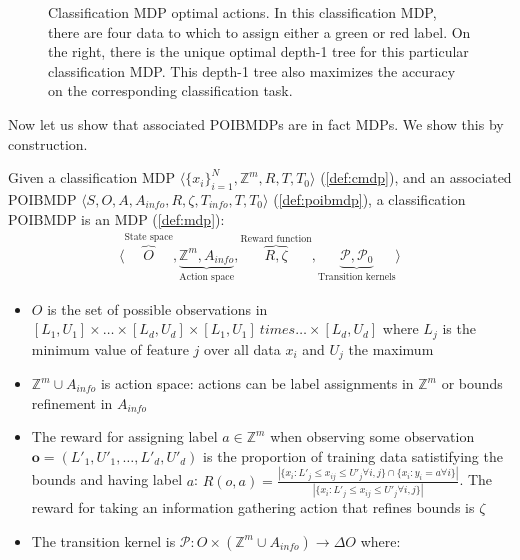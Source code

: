 \begin{figure}[h]
    \caption{Classification MDP optimal actions. In this classification MDP, there are four data to which to assign either a green or red label.
    On the right, there is the unique optimal depth-1 tree for this particular classification MDP. This depth-1 tree also maximizes the accuracy on the corresponding classification task.}\label{example:cmdp}
    \end{figure}

Now let us show that associated POIBMDPs are in fact MDPs. We show this by construction.

\begin{definition}\label{def:cpoibmdp}
    Given a classification MDP $\langle {\{x_i\}}_{i=1}^N, \mathbb{Z}^m, R, T, T_0 \rangle$ (\ref{def:cmdp}), and an associated POIBMDP $\langle S, O, A, A_{info}, R, \zeta, T_{info}, T, T_0\rangle$ (\ref{def:poibmdp}), a classification POIBMDP is an MDP (\ref{def:mdp}):
    \begin{align*}
        \langle \overbrace{O}^{\text{State space}}, \underbrace{\mathbb{Z}^m, A_{info}}_{\text{Action space}}, \overbrace{R, \zeta}^{\text{Reward function}}, \underbrace{\mathcal{P}, \mathcal{P}_0}_{\text{Transition kernels}} \rangle
    \end{align*}
    \begin{itemize}
        \item $O$ is the set of possible observations in $[L_1, U_1] \times \dots \times [L_d, U_d] \times [L_1, U_1] \ times \dots \times [L_d, U_d] $ where $L_j$ is the minimum value of feature $j$ over all data $x_i$ and $U_j$ the maximum
        \item $\mathbb{Z}^m \cup A_{info}$ is action space: actions can be label assignments in $\mathbb{Z}^m$ or bounds refinement in $A_{info}$
        \item The reward for assigning label $a\in \mathbb{Z}^m$ when observing some observation $\boldsymbol{o}=(L'_1, U'_1, \dots, L'_d, U'_d)$ is the proportion of training data satistifying the bounds and having label $a$: $R(o, a) = \frac{|\{x_i: L'_j \leq x_{ij} \leq U'_j \forall i,j \} \cap \{x_i: y_i = a \forall i \}|}{|\{x_i: L'_j \leq x_{ij} \leq U'_j \forall i,j \}|}$. 
        The reward for taking an information gathering action that refines bounds is $\zeta$
        \item The transition kernel is $\mathcal{P}:O \times (\mathbb{Z}^m \cup A_{info}) \rightarrow \Delta O$ where:

\end{itemize}
\end{definition}
